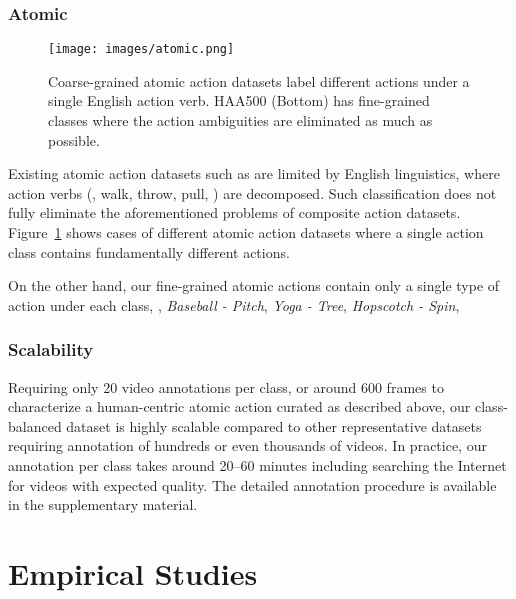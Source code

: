 \documentclass[10pt,twocolumn,letterpaper]{article}
\begin{document}
\subsubsection{Atomic}

\begin{figure}[!t]
\vspace{-0.5em}
\begin{center}
\texttt{[image: images/atomic.png]}
\caption{Coarse-grained atomic action datasets label different actions under a single English action verb. HAA500 (Bottom) has fine-grained classes where the action ambiguities are eliminated as much as possible.}
\label{fig:comparison_atomicity}
\end{center}
\vspace{-2em}
\end{figure}

Existing atomic action datasets such as \cite{ava_speech,AVA,momentsintime} are limited by English linguistics, where action verbs (\eg, walk, throw, pull, \etc) are decomposed. Such classification does not fully eliminate the aforementioned problems of composite action datasets. Figure~\ref{fig:comparison_atomicity} shows cases of different atomic action datasets where a single action class contains fundamentally different actions. 

On the other hand, our fine-grained atomic actions contain only a single type of action under each class, \eg, \textit{Baseball - Pitch}, \textit{Yoga - Tree}, \textit{Hopscotch - Spin}, \etc 

\vspace{-1em}
\subsubsection{Scalability}
\vspace{-0.5em}

Requiring only 20 video annotations per class, or around 600 frames to characterize a human-centric atomic action curated as described above, our class-balanced dataset is highly scalable compared to other representative datasets requiring annotation of hundreds or even thousands of videos. In practice, our annotation per class takes around 20--60 minutes including searching the Internet for videos with expected quality. The detailed annotation procedure is available in the supplementary material.


\section{Empirical Studies}
\end{document}
